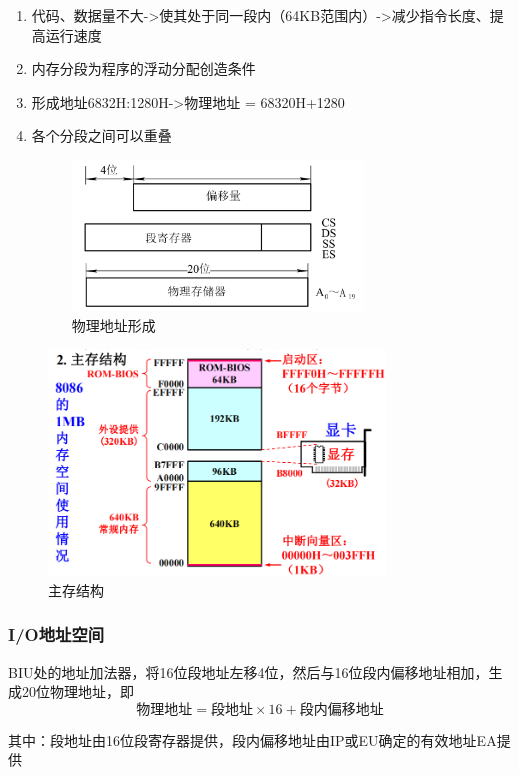 \documentclass{article}
\begin{document}
\begin{enumerate}
    \item 代码、数据量不大->使其处于同一段内（64KB范围内）->减少指令长度、提高运行速度
    \item 内存分段为程序的浮动分配创造条件
    \item 形成地址6832H:1280H->物理地址 = 68320H+1280
    \item 各个分段之间可以重叠
    
    \begin{figure}[H]
        \centering
        \includegraphics[height=4cm]{img/2.1-5.png}
        \caption{物理地址形成}
    \end{figure}
\end{enumerate}


\begin{figure}[H]
    \centering
    \includegraphics[height=6cm]{img/2.1-7.png}
    \caption{主存结构}
\end{figure}

\subsubsection{I/O地址空间}

BIU处的地址加法器，将16位段地址左移4位，然后与16位段内偏移地址相加，生成20位物理地址，即
\begin{equation}
    \text{物理地址}=\text{段地址}\times 16 + \text{段内偏移地址}
\end{equation}

其中：段地址由16位段寄存器提供，段内偏移地址由IP或EU确定的有效地址EA提供
\end{document}
